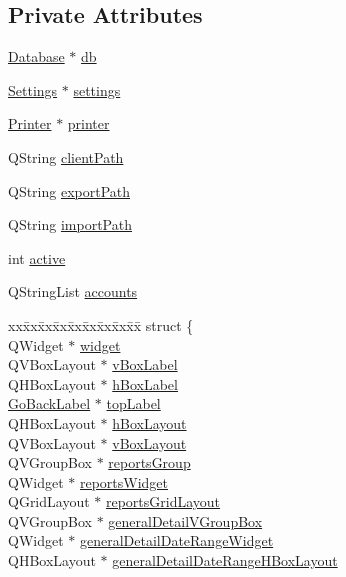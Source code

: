 \subsection*{Private Attributes}
\begin{CompactItemize}
\item 
\hyperlink{classDatabase}{Database} $\ast$ \hyperlink{classReportStack_r0}{db}
\item 
\hyperlink{classSettings}{Settings} $\ast$ \hyperlink{classReportStack_r1}{settings}
\item 
\hyperlink{classPrinter}{Printer} $\ast$ \hyperlink{classReportStack_r2}{printer}
\item 
QString \hyperlink{classReportStack_r3}{client\-Path}
\item 
QString \hyperlink{classReportStack_r4}{export\-Path}
\item 
QString \hyperlink{classReportStack_r5}{import\-Path}
\item 
int \hyperlink{classReportStack_r6}{active}
\item 
QString\-List \hyperlink{classReportStack_r7}{accounts}
\item 
\begin{tabbing}
xx\=xx\=xx\=xx\=xx\=xx\=xx\=xx\=xx\=\kill
struct \{\\
\>QWidget $\ast$ \hyperlink{classReportStack_r8}{widget}\\
\>QVBoxLayout $\ast$ \hyperlink{classReportStack_r9}{vBoxLabel}\\
\>QHBoxLayout $\ast$ \hyperlink{classReportStack_r10}{hBoxLabel}\\
\>\hyperlink{classGoBackLabel}{GoBackLabel} $\ast$ \hyperlink{classReportStack_r11}{topLabel}\\
\>QHBoxLayout $\ast$ \hyperlink{classReportStack_r12}{hBoxLayout}\\
\>QVBoxLayout $\ast$ \hyperlink{classReportStack_r13}{vBoxLayout}\\
\>QVGroupBox $\ast$ \hyperlink{classReportStack_r14}{reportsGroup}\\
\>QWidget $\ast$ \hyperlink{classReportStack_r15}{reportsWidget}\\
\>QGridLayout $\ast$ \hyperlink{classReportStack_r16}{reportsGridLayout}\\
\>QVGroupBox $\ast$ \hyperlink{classReportStack_r17}{generalDetailVGroupBox}\\
\>QWidget $\ast$ \hyperlink{classReportStack_r18}{generalDetailDateRangeWidget}\\
\>QHBoxLayout $\ast$ \hyperlink{classReportStack_r19}{generalDetailDateRangeHBoxLayout}\\

\end{tabbing}
\end{CompactItemize}
